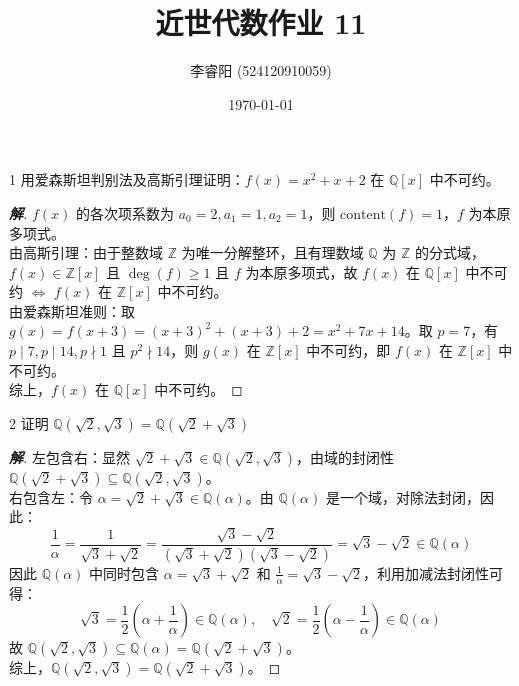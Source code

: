 \documentclass[12pt, a4paper]{article}
\title{近世代数作业 11}
\author{李睿阳 (524120910059)}
\date{\today}
\newenvironment{solution}{
    \begin{proof}[\textbf{解}]
}{
    \end{proof}
}
\begin{document}
\maketitle


\begin{problem}{1}
    用爱森斯坦判别法及高斯引理证明：$f(x)=x^2+x+2$ 在 $\mathbb{Q}[x]$ 中不可约。
\end{problem}
\begin{solution}
    $f(x)$ 的各次项系数为 $a_0=2, a_1=1, a_2=1$，则 $\text{content}(f)=1$，$f$ 为本原多项式。\\
    由高斯引理：由于整数域 $\mathbb{Z}$ 为唯一分解整环，且有理数域 $\mathbb{Q}$ 为 $\mathbb{Z}$ 的分式域，$f(x) \in \mathbb{Z}[x]$ 且 $\deg(f) \ge 1$ 且 $f$ 为本原多项式，故 $f(x)$ 在 $\mathbb{Q}[x]$ 中不可约 $\iff$ $f(x)$ 在 $\mathbb{Z}[x]$ 中不可约。\\
    由爱森斯坦准则：取 $g(x) = f(x+3) = (x+3)^2 + (x+3) + 2 = x^2 + 7x + 14$。取 $p=7$，有 $p \mid 7, p \mid 14, p \nmid 1$ 且 $p^2 \nmid 14$，则 $g(x)$ 在 $\mathbb{Z}[x]$ 中不可约，即 $f(x)$ 在 $\mathbb{Z}[x]$ 中不可约。\\
    综上，$f(x)$ 在 $\mathbb{Q}[x]$ 中不可约。
\end{solution}


\begin{problem}{2}
    证明 $\mathbb{Q}(\sqrt{2},\sqrt{3})=\mathbb{Q}(\sqrt{2}+\sqrt{3})$
\end{problem}
\begin{solution}
    左包含右：显然 $\sqrt{2}+\sqrt{3} \in \mathbb{Q}(\sqrt{2}, \sqrt{3})$，由域的封闭性 $\mathbb{Q}(\sqrt{2}+\sqrt{3}) \subseteq \mathbb{Q}(\sqrt{2}, \sqrt{3})$。\\
    右包含左：令 $\alpha = \sqrt{2}+\sqrt{3} \in \mathbb{Q}(\alpha)$。由 $\mathbb{Q}(\alpha)$ 是一个域，对除法封闭，因此：
    $$\frac{1}{\alpha} = \frac{1}{\sqrt{3} + \sqrt{2}} = \frac{\sqrt{3} - \sqrt{2}}{(\sqrt{3} + \sqrt{2})(\sqrt{3} - \sqrt{2})} = \sqrt{3} - \sqrt{2} \in \mathbb{Q}(\alpha)$$
    因此 $\mathbb{Q}(\alpha)$ 中同时包含 $\alpha = \sqrt{3} + \sqrt{2}$ 和 $\frac{1}{\alpha} = \sqrt{3} - \sqrt{2}$，利用加减法封闭性可得：
    $$\sqrt{3} = \frac{1}{2} \left( \alpha + \frac{1}{\alpha} \right) \in \mathbb{Q}(\alpha), \quad \sqrt{2} = \frac{1}{2} \left( \alpha - \frac{1}{\alpha} \right) \in \mathbb{Q}(\alpha)$$
    故 $\mathbb{Q}(\sqrt{2}, \sqrt{3}) \subseteq \mathbb{Q}(\alpha) = \mathbb{Q}(\sqrt{2}+\sqrt{3})$。\\
    综上，$\mathbb{Q}(\sqrt{2}, \sqrt{3}) = \mathbb{Q}(\sqrt{2} + \sqrt{3})$。
\end{solution}
\end{document}
